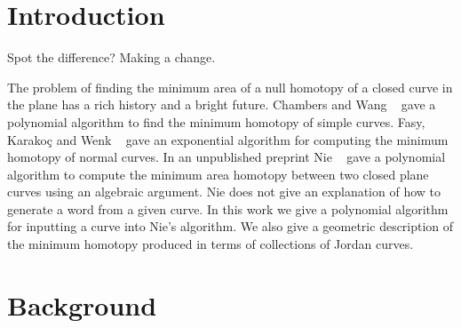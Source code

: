 \documentclass[11pt]{article}
\begin{document}
\maketitle



\section{Introduction}
Spot the difference?
Making a change.

The problem of finding the minimum area of a null homotopy of a closed curve in the plane has a rich history and a bright future. Chambers and Wang ~\cite{cw2013} gave a polynomial algorithm to find the minimum homotopy of simple curves. Fasy, Karako\c{c} and Wenk ~\cite{fkw2017} gave an exponential algorithm for computing the minimum homotopy of normal curves. In an unpublished preprint Nie ~\cite{nie2014} gave a polynomial algorithm to compute the minimum area homotopy between two closed plane curves using an algebraic argument. Nie does not give an explanation of how to generate a word from a given curve. In this work we give a polynomial algorithm for inputting a curve into Nie's algorithm. We also give a geometric description of the minimum homotopy produced in terms of collections of Jordan curves. 





\section{Background}
\end{document}
